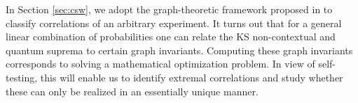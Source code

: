 In Section \ref{sec:csw}, we adopt the graph-theoretic framework proposed in \cite{Cabello2014} to classify correlations of an arbitrary experiment. It turns out that for a general linear combination of probabilities one can relate the KS non-contextual and quantum suprema to certain graph invariants. Computing these graph invariants corresponds to solving a mathematical optimization problem. In view of self-testing, this will enable us to identify extremal correlations and study whether these can only be realized in an essentially unique manner.
